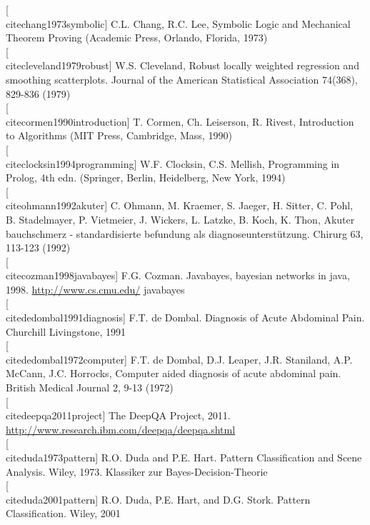 \documentclass[10pt]{book}
\begin{document}
[\\cite{chang1973symbolic}] C.L. Chang, R.C. Lee, Symbolic Logic and Mechanical Theorem Proving (Academic Press, Orlando, Florida, 1973)\\[0pt]
[\\cite{cleveland1979robust}] W.S. Cleveland, Robust locally weighted regression and smoothing scatterplots. Journal of the American Statistical Association 74(368), 829-836 (1979)\\[0pt]
[\\cite{cormen1990introduction}] T. Cormen, Ch. Leiserson, R. Rivest, Introduction to Algorithms (MIT Press, Cambridge, Mass, 1990)\\[0pt]
[\\cite{clocksin1994programming}] W.F. Clocksin, C.S. Mellish, Programming in Prolog, 4th edn. (Springer, Berlin, Heidelberg, New York, 1994)\\[0pt]
[\\cite{ohmann1992akuter}] C. Ohmann, M. Kraemer, S. Jaeger, H. Sitter, C. Pohl, B. Stadelmayer, P. Vietmeier, J. Wickers, L. Latzke, B. Koch, K. Thon, Akuter bauchschmerz - standardisierte befundung als diagnoseunterstützung. Chirurg 63, 113-123 (1992)\\[0pt]
[\\cite{cozman1998javabayes}] F.G. Cozman. Javabayes, bayesian networks in java, 1998. \href{http://www.cs.cmu.edu/}{http://www.cs.cmu.edu/} javabayes\\[0pt]
[\\cite{dedombal1991diagnosis}] F.T. de Dombal. Diagnosis of Acute Abdominal Pain. Churchill Livingstone, 1991\\[0pt]
[\\cite{dedombal1972computer}] F.T. de Dombal, D.J. Leaper, J.R. Staniland, A.P. McCann, J.C. Horrocks, Computer aided diagnosis of acute abdominal pain. British Medical Journal 2, 9-13 (1972)\\[0pt]
[\\cite{deepqa2011project}] The DeepQA Project, 2011. \href{http://www.research.ibm.com/deepqa/deepqa.shtml}{http://www.research.ibm.com/deepqa/deepqa.shtml}\\[0pt]
[\\cite{duda1973pattern}] R.O. Duda and P.E. Hart. Pattern Classification and Scene Analysis. Wiley, 1973. Klassiker zur Bayes-Decision-Theorie\\[0pt]
[\\cite{duda2001pattern}] R.O. Duda, P.E. Hart, and D.G. Stork. Pattern Classification. Wiley, 2001\\[0pt]
\end{document}
